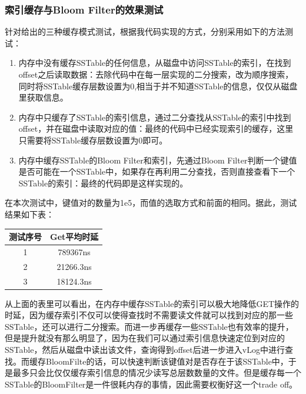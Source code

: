 \documentclass{article}
\begin{document}
\subsubsection{索引缓存与Bloom Filter的效果测试}

针对给出的三种缓存模式测试，根据我代码实现的方式，分别采用如下的方法测试：

\begin{enumerate}
    \item 内存中没有缓存SSTable的任何信息，从磁盘中访问SSTable的索引，在找到offset之后读取数据：去除代码中在每一层实现的二分搜索，改为顺序搜索，同时将SSTable缓存层数设置为0,相当于并不知道SSTable的信息，仅仅从磁盘里获取信息。
    \item 内存中只缓存了SSTable的索引信息，通过二分查找从SSTable的索引中找到offset，并在磁盘中读取对应的值：最终的代码中已经实现索引的缓存，这里只需要将SSTable缓存层数设置为0即可。
    \item 内存中缓存SSTable的Bloom Filter和索引，先通过Bloom Filter判断一个键值是否可能在一个SSTable中，如果存在再利用二分查找，否则直接查看下一个SSTable的索引：最终的代码即是这样实现的。
\end{enumerate}

在本次测试中，键值对的数量为1e5，而值的选取方式和前面的相同。据此，测试结果如下表：

\begin{table}[H]
    \centering
    \begin{tabular}{cc}
        \toprule
        测试序号 & Get平均时延 \\
        \midrule
        1        & 789367ns    \\
        2        & 21266.3ns   \\
        3        & 18124.3ns   \\
        \bottomrule
    \end{tabular}
\end{table}

从上面的表里可以看出，在内存中缓存SSTable的索引可以极大地降低GET操作的时延，因为缓存索引不仅可以使得查找时不需要读文件就可以找到对应的那一些SSTable，还可以进行二分搜索。而进一步再缓存一些SSTable也有效率的提升，但是提升就没有那么明显了，因为在我们可以通过索引信息快速定位到对应的SSTable，然后从磁盘中读出该文件，查询得到offset后进一步进入vLog中进行查找。而缓存BloomFilte的话，可以快速判断该键值对是否存在于该SSTable中，于是最多只会比仅仅缓存索引信息的情况少读写总层数数量的文件。但是缓存每一个SSTable的BloomFilter是一件很耗内存的事情，因此需要权衡好这一个trade off。
\end{document}
